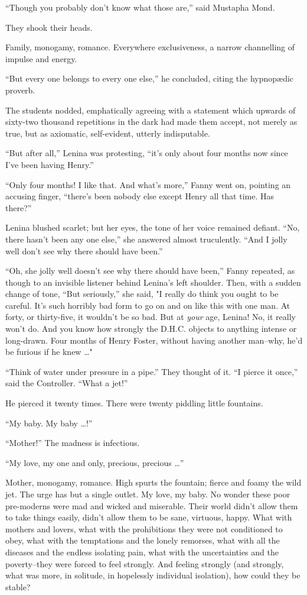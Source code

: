 \documentclass[12pt]{report}
\begin{document}
``Though you probably don't know what those are,'' said Mustapha Mond.

They shook their heads.

Family, monogamy, romance. Everywhere exclusiveness, a narrow
channelling of impulse and energy.

``But every one belongs to every one else,'' he concluded, citing the
hypnopædic proverb.

The students nodded, emphatically agreeing with a statement which
upwards of sixty-two thousand repetitions in the dark had made them
accept, not merely as true, but as axiomatic, self-evident, utterly
indisputable.

``But after all,'' Lenina was protesting, ``it's only about four months
now since I've been having Henry.''

``Only four months! I like that. And what's more,'' Fanny went on,
pointing an accusing finger, ``there's been nobody else except Henry all
that time. Has there?''

Lenina blushed scarlet; but her eyes, the tone of her voice remained
defiant. ``No, there hasn't been any one else,'' she answered almost
truculently. ``And I jolly well don't see why there should have been.''

``Oh, she jolly well doesn't see why there should have been,'' Fanny
repeated, as though to an invisible listener behind Lenina's left
shoulder. Then, with a sudden change of tone, ``But seriously,'' she
said, "I really do think you ought to be careful. It's such horribly bad
form to go on and on like this with one man. At forty, or thirty-five,
it wouldn't be so bad. But at \emph{your} age, Lenina! No, it really
won't do. And you know how strongly the D.H.C. objects to anything
intense or long-drawn. Four months of Henry Foster, without having
another man--why, he'd be furious if he knew \ldots{}"

``Think of water under pressure in a pipe.'' They thought of it. ``I
pierce it once,'' said the Controller. ``What a jet!''

He pierced it twenty times. There were twenty piddling little fountains.

``My baby. My baby \ldots{}!''

``Mother!'' The madness is infectious.

``My love, my one and only, precious, precious \ldots{}''

Mother, monogamy, romance. High spurts the fountain; fierce and foamy
the wild jet. The urge has but a single outlet. My love, my baby. No
wonder these poor pre-moderns were mad and wicked and miserable. Their
world didn't allow them to take things easily, didn't allow them to be
sane, virtuous, happy. What with mothers and lovers, what with the
prohibitions they were not conditioned to obey, what with the
temptations and the lonely remorses, what with all the diseases and the
endless isolating pain, what with the uncertainties and the
poverty--they were forced to feel strongly. And feeling strongly (and
strongly, what was more, in solitude, in hopelessly individual
isolation), how could they be stable?
\end{document}
